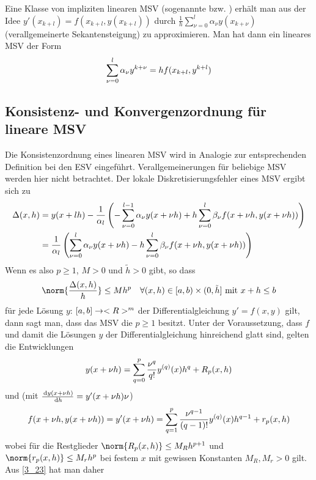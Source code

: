Eine Klasse von impliziten linearen MSV (sogenannte  bzw. ) erhält man aus der Idee $y'(x_{k+l}) = f(x_{k+l},y(x_{k+l}))$ durch $\frac{1}{h}\sum_{\nu=0}^l \alpha_\nu y(x_{k+\nu})$ (verallgemeinerte Sekantensteigung) zu approximieren. Man hat dann ein lineares MSV der Form
\begin{align}
	\sum_{\nu=0}^l \alpha_\nu y^{k+\nu} = hf(x_{k+l},y^{k+l}) \notag
\end{align}

\subsection{Konsistenz- und Konvergenzordnung für lineare MSV}

Die Konsistenzordnung eines linearen MSV wird in Analogie zur entsprechenden Definition bei den ESV eingeführt. Verallgemeinerungen für beliebige MSV werden hier nicht betrachtet. Der lokale Diskretisierungsfehler eines MSV ergibt sich zu
\begin{align}
	\Delta(x,h) &= y(x+lh) - \frac{1}{\alpha_l}\left(-\sum_{\nu=0}^{l-1} \alpha_\nu y(x+\nu h) + h\sum_{\nu=0}^l \beta_\nu f(x+\nu h,y(x+\nu h))\right) \notag \\
	\label{3_23}
	&= \frac{1}{\alpha_l} \left(\sum_{\nu=0}^l \alpha_\nu y(x+\nu h) - h\sum_{\nu=0}^l \beta_\nu f(x+\nu h,y(x+\nu h))\right)
\end{align}
Wenn es also $p\ge 1$, $M>0$ und $\tilde{h}>0$ gibt, so dass
\begin{align}
	\norm{\frac{\Delta(x,h)}{h}} \le Mh^p\quad\forall (x,h)\in [a,b)\times (0,\tilde{h}]\text{ mit } x+h\le b \notag
\end{align}
für jede Lösung $y$: $[a,b]\to<R>^m$ der Differentialgleichung $y'=f(x,y)$ gilt, dann sagt man, dass das MSV die  $p\ge 1$ besitzt. Unter der Voraussetzung, dass $f$ und damit die Lösungen $y$ der Differentialgleichung hinreichend glatt sind, gelten die Entwicklungen
\begin{align}
	y(x+\nu h) = \sum_{q=0}^{p} \frac{\nu^q}{q!} y^{(q)}(x) h^q + R_p(x,h) \notag
\end{align}
und (mit $\frac{\,\mathrm{d} y(x+\nu h)}{\,\mathrm{d} h} = y'(x+\nu h)\nu$)
\begin{align}
	f(x+\nu h,y(x+\nu h)) = y'(x+\nu h) = \sum_{q=1}^{p} \frac{\nu^{q-1}}{(q-1)!} y^{(q)}(x)h^{q-1} + r_p(x,h) \notag
\end{align}
wobei für die Restglieder $\norm{R_p(x,h)} \le M_R h^{p+1}$ und $\norm{r_p(x,h)}\le M_r h^p$ bei festem $x$ mit gewissen Konstanten $M_R,M_r>0$ gilt. Aus \cref{3_23} hat man daher
